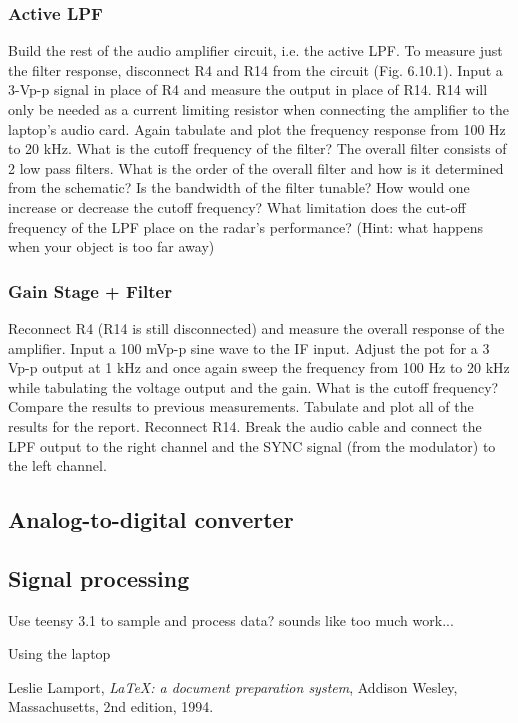 \documentclass[letterpaper, 11pt]{article}
\begin{document}
\subsubsection{Active LPF}
Build the rest of the audio amplifier circuit, i.e. the active LPF. To measure just the filter response, disconnect R4 and R14 from the circuit (Fig. 6.10.1). Input a 3-Vp-p signal in place of R4 and measure the output in place of R14. R14 will only be needed as a current limiting resistor when connecting the amplifier to the laptop’s audio card. Again tabulate and plot the frequency response from 100 Hz to 20 kHz. What is the cutoff frequency of the filter?
The overall filter consists of 2 low pass filters. What is the order of the overall filter and how is it determined from the schematic? Is the bandwidth of the filter tunable? How would one increase or decrease the cutoff frequency?
What limitation does the cut-off frequency of the LPF place on the radar’s performance?  (Hint: what happens when your object is too far away)

\subsubsection{Gain Stage + Filter}
Reconnect R4 (R14 is still disconnected) and measure the overall response of the amplifier. Input a 100 mVp-p sine wave to the IF input. Adjust the pot for a 3 Vp-p output at 1 kHz and once again sweep the frequency from 100 Hz to 20 kHz while tabulating the voltage output and the gain. What is the cutoff frequency? Compare the results to previous measurements. Tabulate and plot all of the results for the report.
Reconnect R14. Break the audio cable and connect the LPF output to the right channel and the SYNC signal (from the modulator) to the left channel. 


\subsection{Analog-to-digital converter}

\subsection{Signal processing}

Use teensy 3.1 to sample and process data? sounds like too much work...

Using the laptop



\begin{thebibliography}{9}

  Leslie Lamport,
  \emph{\LaTeX: a document preparation system},
  Addison Wesley, Massachusetts,
  2nd edition,
  1994.

\end{thebibliography}
\end{document}
